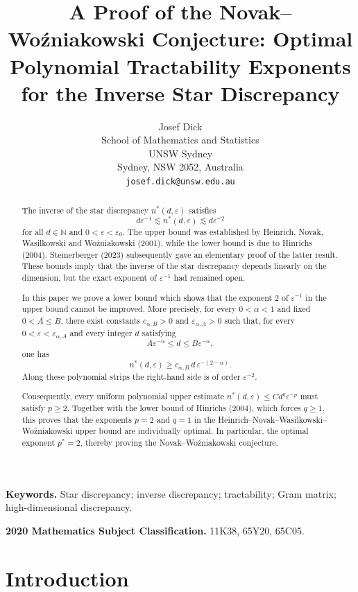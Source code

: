 \documentclass[11pt]{article}
\title{A Proof of the Novak--Wo\'{z}niakowski Conjecture:
Optimal Polynomial Tractability Exponents for the Inverse Star Discrepancy}
\author{
Josef Dick\\
School of Mathematics and Statistics\\
UNSW Sydney\\
Sydney, NSW 2052, Australia\\
\texttt{josef.dick@unsw.edu.au}
}
\date{}
\theoremstyle{plain}
\theoremstyle{remark}
\theoremstyle{definition}
\newcommand{\1}{\mathbf{1}}
\begin{document}
\maketitle

\begin{abstract}
The inverse of the star discrepancy $n^\ast(d, \varepsilon)$ satisfies
 \[
d \varepsilon^{-1} \lesssim n^{\ast}(d,\varepsilon)\lesssim  d\varepsilon^{-2}
\] for all $d \in \mathbb{N}$ and $0 < \varepsilon < \varepsilon_0$. The upper bound was established by Heinrich, Novak, Wasilkowski and Wo\'{z}niakowski (2001), while the lower bound is due to Hinrichs (2004). Steinerberger (2023) subsequently gave an elementary proof of the latter result. These bounds imply that the inverse of the star discrepancy depends linearly on the dimension, but the exact exponent of $\varepsilon^{-1}$ had remained open. 
\medskip

In this paper we prove a lower bound which shows that the exponent $2$ of $\varepsilon^{-1}$ in the upper bound cannot be improved. More precisely, for every \(0<\alpha<1\) and fixed \(0<A\le B\),
there exist constants \(c_{\alpha,B}>0\) and
\(\varepsilon_{\alpha,A}>0\) such that, for every
\(0<\varepsilon<\varepsilon_{\alpha,A}\) and every integer \(d\)
satisfying
\[
 A\varepsilon^{-\alpha}\le d\le B\varepsilon^{-\alpha},
\]
one has
\[
 n^\ast(d,\varepsilon)
 \ge c_{\alpha,B}\,d\,\varepsilon^{-(2-\alpha)}.
\]
Along these polynomial strips the right-hand side is of order $\varepsilon^{-2}$.  
\medskip

Consequently, every uniform polynomial upper estimate $n^{\ast}(d,\varepsilon)\le C d^q\varepsilon^{-p}$ must satisfy $p\ge2$.  Together with the lower bound of Hinrichs (2004), which forces $q\ge1$, this proves that the exponents $p=2$ and $q=1$ in the Heinrich--Novak--Wasilkowski--Wo\'{z}niakowski upper bound are individually optimal. In particular, the optimal exponent \(p^\ast = 2\), thereby proving the
Novak--Wo\'{z}niakowski conjecture.
\end{abstract}



\medskip
\noindent\textbf{Keywords.} Star discrepancy; inverse discrepancy; tractability; Gram matrix; high-dimensional discrepancy.

\noindent\textbf{2020 Mathematics Subject Classification.} 11K38, 65Y20, 65C05.

\section{Introduction}\label{sec:introduction}
\end{document}
